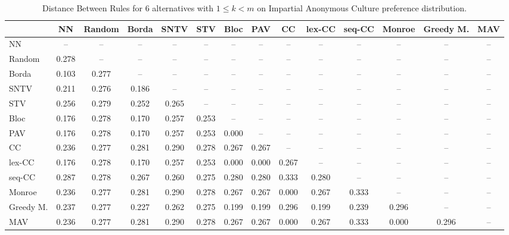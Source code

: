 
\begin{table*}
\centering
\begin{tabular}{lccccccccccccc}
\toprule
 & NN & Random & Borda & SNTV & STV & Bloc & PAV & CC & lex-CC & seq-CC & Monroe & Greedy M. & MAV \\
\midrule
NN & -- & -- & -- & -- & -- & -- & -- & -- & -- & -- & -- & -- & -- \\
Random & 0.278 & -- & -- & -- & -- & -- & -- & -- & -- & -- & -- & -- & -- \\
Borda & 0.103 & 0.277 & -- & -- & -- & -- & -- & -- & -- & -- & -- & -- & -- \\
SNTV & 0.211 & 0.276 & 0.186 & -- & -- & -- & -- & -- & -- & -- & -- & -- & -- \\
STV & 0.256 & 0.279 & 0.252 & 0.265 & -- & -- & -- & -- & -- & -- & -- & -- & -- \\
Bloc & 0.176 & 0.278 & 0.170 & 0.257 & 0.253 & -- & -- & -- & -- & -- & -- & -- & -- \\
PAV & 0.176 & 0.278 & 0.170 & 0.257 & 0.253 & 0.000 & -- & -- & -- & -- & -- & -- & -- \\
CC & 0.236 & 0.277 & 0.281 & 0.290 & 0.278 & 0.267 & 0.267 & -- & -- & -- & -- & -- & -- \\
lex-CC & 0.176 & 0.278 & 0.170 & 0.257 & 0.253 & 0.000 & 0.000 & 0.267 & -- & -- & -- & -- & -- \\
seq-CC & 0.287 & 0.278 & 0.267 & 0.260 & 0.275 & 0.280 & 0.280 & 0.333 & 0.280 & -- & -- & -- & -- \\
Monroe & 0.236 & 0.277 & 0.281 & 0.290 & 0.278 & 0.267 & 0.267 & 0.000 & 0.267 & 0.333 & -- & -- & -- \\
Greedy M. & 0.237 & 0.277 & 0.227 & 0.262 & 0.275 & 0.199 & 0.199 & 0.296 & 0.199 & 0.239 & 0.296 & -- & -- \\
MAV & 0.236 & 0.277 & 0.281 & 0.290 & 0.278 & 0.267 & 0.267 & 0.000 & 0.267 & 0.333 & 0.000 & 0.296 & -- \\
\bottomrule
\end{tabular}

\caption{Distance Between Rules for 6 alternatives with $1 \leq k < m$ on Impartial Anonymous Culture preference distribution.}
\end{table*}
